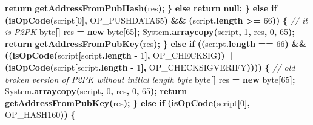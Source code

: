 \documentclass[
  italian,
  openany]{book}
\newenvironment{Shaded}{\begin{snugshade}}{\end{snugshade}}
\newcommand{\BuiltInTok}[1]{#1}
\newcommand{\CommentTok}[1]{\textcolor[rgb]{0.56,0.35,0.01}{\textit{#1}}}
\newcommand{\ControlFlowTok}[1]{\textcolor[rgb]{0.13,0.29,0.53}{\textbf{#1}}}
\newcommand{\DataTypeTok}[1]{\textcolor[rgb]{0.13,0.29,0.53}{#1}}
\newcommand{\DecValTok}[1]{\textcolor[rgb]{0.00,0.00,0.81}{#1}}
\newcommand{\FunctionTok}[1]{\textcolor[rgb]{0.13,0.29,0.53}{\textbf{#1}}}
\newcommand{\KeywordTok}[1]{\textcolor[rgb]{0.13,0.29,0.53}{\textbf{#1}}}
\newcommand{\NormalTok}[1]{#1}
\newcommand{\OperatorTok}[1]{\textcolor[rgb]{0.81,0.36,0.00}{\textbf{#1}}}
\begin{document}
\begin{Shaded}
\begin{Highlighting}[]
            \ControlFlowTok{return} \FunctionTok{getAddressFromPubHash}\OperatorTok{(}\NormalTok{res}\OperatorTok{);}
        \OperatorTok{\}} \ControlFlowTok{else} \ControlFlowTok{return} \KeywordTok{null}\OperatorTok{;}
    \OperatorTok{\}} \ControlFlowTok{else} \ControlFlowTok{if} \OperatorTok{(}\FunctionTok{isOpCode}\OperatorTok{(}\NormalTok{script}\OperatorTok{[}\DecValTok{0}\OperatorTok{],}\NormalTok{ OP\_PUSHDATA65}\OperatorTok{)} \OperatorTok{\&\&} \OperatorTok{(}\NormalTok{script}\OperatorTok{.}\FunctionTok{length} \OperatorTok{\textgreater{}=} \DecValTok{66}\OperatorTok{))} \OperatorTok{\{}
        \CommentTok{// it is P2PK}
        \DataTypeTok{byte}\OperatorTok{[]}\NormalTok{ res }\OperatorTok{=} \KeywordTok{new} \DataTypeTok{byte}\OperatorTok{[}\DecValTok{65}\OperatorTok{];}
        \BuiltInTok{System}\OperatorTok{.}\FunctionTok{arraycopy}\OperatorTok{(}\NormalTok{script}\OperatorTok{,} \DecValTok{1}\OperatorTok{,}\NormalTok{ res}\OperatorTok{,} \DecValTok{0}\OperatorTok{,} \DecValTok{65}\OperatorTok{);}
        \ControlFlowTok{return} \FunctionTok{getAddressFromPubKey}\OperatorTok{(}\NormalTok{res}\OperatorTok{);}
    \OperatorTok{\}} \ControlFlowTok{else} \ControlFlowTok{if} \OperatorTok{((}\NormalTok{script}\OperatorTok{.}\FunctionTok{length} \OperatorTok{==} \DecValTok{66}\OperatorTok{)} \OperatorTok{\&\&}
               \OperatorTok{((}\FunctionTok{isOpCode}\OperatorTok{(}\NormalTok{script}\OperatorTok{[}\NormalTok{script}\OperatorTok{.}\FunctionTok{length} \OperatorTok{{-}} \DecValTok{1}\OperatorTok{],}\NormalTok{ OP\_CHECKSIG}\OperatorTok{))}
             \OperatorTok{||} \OperatorTok{(}\FunctionTok{isOpCode}\OperatorTok{(}\NormalTok{script}\OperatorTok{[}\NormalTok{script}\OperatorTok{.}\FunctionTok{length} \OperatorTok{{-}} \DecValTok{1}\OperatorTok{],}\NormalTok{ OP\_CHECKSIGVERIFY}\OperatorTok{))))} \OperatorTok{\{}
        \CommentTok{// old broken version of P2PK without initial length byte}
        \DataTypeTok{byte}\OperatorTok{[]}\NormalTok{ res }\OperatorTok{=} \KeywordTok{new} \DataTypeTok{byte}\OperatorTok{[}\DecValTok{65}\OperatorTok{];}
        \BuiltInTok{System}\OperatorTok{.}\FunctionTok{arraycopy}\OperatorTok{(}\NormalTok{script}\OperatorTok{,} \DecValTok{0}\OperatorTok{,}\NormalTok{ res}\OperatorTok{,} \DecValTok{0}\OperatorTok{,} \DecValTok{65}\OperatorTok{);}
        \ControlFlowTok{return} \FunctionTok{getAddressFromPubKey}\OperatorTok{(}\NormalTok{res}\OperatorTok{);}
    \OperatorTok{\}} \ControlFlowTok{else} \ControlFlowTok{if} \OperatorTok{(}\FunctionTok{isOpCode}\OperatorTok{(}\NormalTok{script}\OperatorTok{[}\DecValTok{0}\OperatorTok{],}\NormalTok{ OP\_HASH160}\OperatorTok{))} \OperatorTok{\{}

\end{Highlighting}
\end{Shaded}
\end{document}
